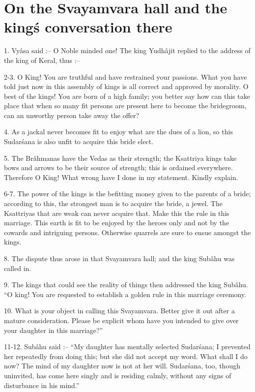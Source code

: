 ﻿\chapter{On the Svayamvara hall and the king\'s conversation there}

1. Vy\^asa said :-- O Noble minded one! The king Yudh\^ajit replied to the address of the king of Keral, thus :--

2-3. O King! You are truthful and have restrained your passions. What you have told just now in this assembly of kings is all correct and approved by morality. O best of the kings! You are born of a high family; you better say how can this take place that when so many fit persons are present here to become the bridegroom, can an unworthy person take away the offer?

4. As a jackal never becomes fit to enjoy what are the dues of a lion, so this Sudar\'sana is also unfit to acquire this bride elect.

5. The Br\^ahmanas have the Vedas as their strength; the Ksattriya kings take bows and arrows to be their source of strength; this is ordained everywhere. Therefore O King! What wrong have I done in my statement. Kindly explain.

6-7. The power of the kings is the befitting money given to the parents of a bride; according to this, the strongest man is to acquire the bride, a jewel. The Ksattriyas that are weak can never acquire that. Make this the rule in this marriage. This earth is fit to be enjoyed by the heroes only and not by the cowards and intriguing persons. Otherwise quarrels are sure to ensue amongst the kings.

8. The dispute thus arose in that Svayamvara hall; and the king Sub\^ahu was called in.

9. The kings that could see the reality of things then addressed the king Sub\^ahu. ``O king! You are requested to establish a golden rule in this marriage ceremony.

10. What is your object in calling this Svayamvara. Better give it out after a mature consideration. Please be explicit whom have you intended to give over your daughter in this marriage?''

11-12. Sub\^ahu said :-- ``My daughter has mentally selected Sudar\'sana; I prevented her repeatedly from doing this; but she did not accept my word. What shall I do now? The mind of my daughter now is not at her will. Sudar\'sana, too, though uninvited, has come here singly and is residing calmly, without any signs of disturbance in his mind.''

